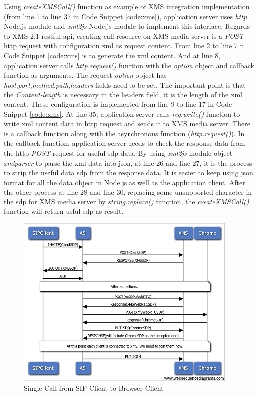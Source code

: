 \par Using \textit{createXMSCall()} function as example of XMS integration implementation (from line 1 to line 37 in Code Snippet \ref{code:xms}), application server uses \textit{http} Node.js module and \textit{xml2js} Node.js module to implement this interface. Regards to XMS 2.1 \gls{rest}ful \gls{api}, creating call resource on XMS media server is a \textit{POST} \gls{http} request with configuration \gls{xml} as request content. From line 2 to line 7 n Code Snippet \ref{code:xms} is to generate the \gls{xml} content. And at line 8, application server calls \textit{http.request()} function with the \textit{option} object and callback function as arguments. The request \textit{option} object has \textit{host},\textit{port},\textit{method},\textit{path},\textit{headers} fields need to be set. The important point is that the \textit{Content-length} is necessary in the headers field, it is the length of the \gls{xml} content. These configuration is implemented from line 9 to line 17 in Code Snippet \ref{code:xms}. At line 35, application server calls \textit{req.write()} function to write \gls{xml} content data in \gls{http} request and sends it to XMS media server. There is a callback function along with the asynchronous function (\textit{http.request()}). In the callback function, application server needs to check the response data from the \gls{http} \textit{POST} request for useful \gls{sdp} data. By using \textit{xml2js} module object \textit{xmlparser} to parse the \gls{xml} data into \gls{json}, at line 26 and line 27, it is the process to strip the useful data \gls{sdp} from the response data. It is easier to keep using \gls{json} format for all the data object in Node.js as well as the application client. After the other process at line 28 and line 30, replacing some unsupported character in the \gls{sdp} for XMS media server by \textit{string.replace()} function, the \textit{createXMSCall()} function will return usful \gls{sdp} as result.

\begin{figure}
	\centering
    	\includegraphics[width=0.95\textwidth,natwidth=610,natheight=642]{figs/sip2xms.png}
  	\caption{Single Call from SIP Client to Browser Client}
  	\label{fig:sip2xms}
\end{figure}

